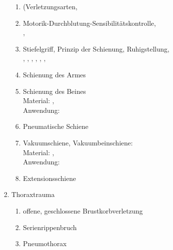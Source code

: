 \begin{WidePar}
\begin{multicols}{2}
\begin{enumerate}
\begin{enumerate}
\begin{enumerate}
        \item (Verletzungsarten,
        
        \item Motorik-Durchblutung-Sensibilitätskontrolle,\\
        ,
        
        \item Stiefelgriff,
        Prinzip der Schienung,
        Ruhigstellung,\\
        ,
        ,
        ,
        ,
        ,
        ,
        \item        Schienung des Armes
        \\
        \item        Schienung des Beines
        \\
        Material: \dotfill
        ,\\
        Anwendung:  \dotfill
        \item        Pneumatische Schiene
        \\
        \item        Vakuumschiene,
        Vakuumbeinschiene:\\
        Material: \dotfill
        ,\\
        Anwendung:  \dotfill
        \item        Extensionsschiene \dotfill {}
      \end{enumerate}
      \item Thoraxtrauma
      \begin{enumerate}
        \item
        offene, geschlossene Brustkorbverletzung \dotfill {}
        \item        Serienrippenbruch \dotfill  {}
        \item        Pneumothorax \dotfill {}

\end{enumerate}
\end{enumerate}
\end{enumerate}
\end{multicols}
\end{WidePar}
